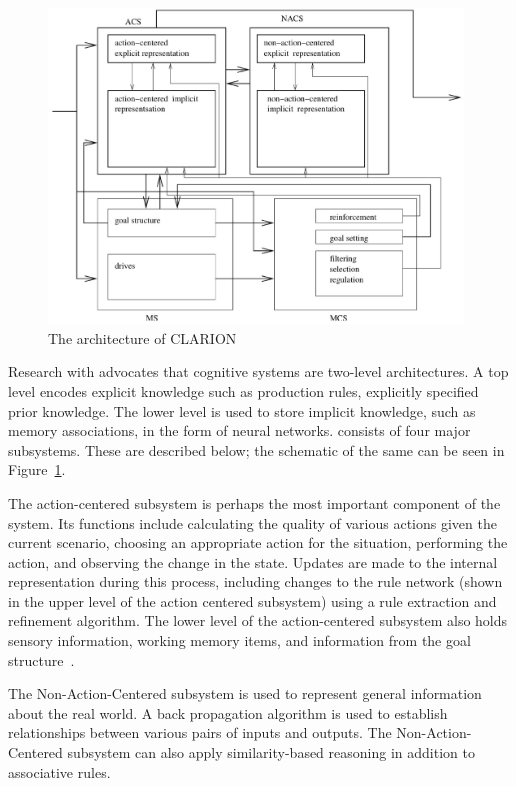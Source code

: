 \begin{figure}[htp]
  \centering
  \includegraphics[width=110mm]{CLARION}
  \caption{The architecture of CLARION \cite{citeulike:3439185}}
  \label{CLARION_ARCH}
\end{figure}
Research with \clarion advocates that cognitive systems are two-level
architectures.  A top level encodes explicit knowledge
such as production rules, explicitly specified prior knowledge. The
lower level is used to store implicit knowledge, such as memory
associations, in the form of neural networks. \clarion consists of four
major subsystems.  These are described below; the schematic of the same
can be seen in Figure~\ref{CLARION_ARCH}.

The action-centered subsystem is perhaps the most important component
of the system. Its functions include calculating the quality of
various actions given the current scenario, choosing an appropriate
action for the situation, performing the action, and observing the
change in the state.  Updates are made to the internal representation
during this process, including changes to the rule network (shown in
the upper level of the action centered subsystem) using a rule
extraction and refinement algorithm. The lower level of the
action-centered subsystem also holds sensory information, working
memory items, and information from the goal
structure~\cite{Sun:2003aa}.

The Non-Action-Centered subsystem is used to represent general
information about the real world. A back propagation algorithm is used
to establish relationships between various pairs of inputs and
outputs. The Non-Action-Centered subsystem can also apply
similarity-based reasoning in addition to associative rules.

